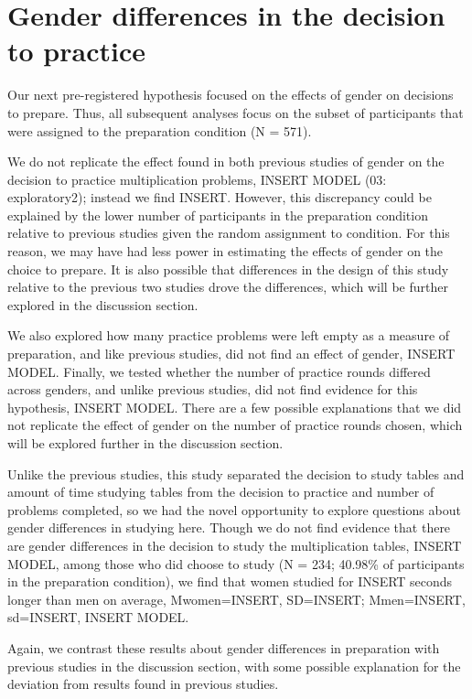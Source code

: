 \documentclass[a4paper, nobind]{templates/ociamthesis}
\begin{document}
\hypertarget{gender-differences-in-the-decision-to-practice}{%
\section{Gender differences in the decision to practice}\label{gender-differences-in-the-decision-to-practice}}

Our next pre-registered hypothesis focused on the effects of gender on decisions to prepare. Thus, all subsequent analyses focus on the subset of participants that were assigned to the preparation condition (N = 571).

We do not replicate the effect found in both previous studies of gender on the decision to practice multiplication problems, INSERT MODEL (03: exploratory2); instead we find INSERT. However, this discrepancy could be explained by the lower number of participants in the preparation condition relative to previous studies given the random assignment to condition. For this reason, we may have had less power in estimating the effects of gender on the choice to prepare. It is also possible that differences in the design of this study relative to the previous two studies drove the differences, which will be further explored in the discussion section.

We also explored how many practice problems were left empty as a measure of preparation, and like previous studies, did not find an effect of gender, INSERT MODEL. Finally, we tested whether the number of practice rounds differed across genders, and unlike previous studies, did not find evidence for this hypothesis, INSERT MODEL. There are a few possible explanations that we did not replicate the effect of gender on the number of practice rounds chosen, which will be explored further in the discussion section.

Unlike the previous studies, this study separated the decision to study tables and amount of time studying tables from the decision to practice and number of problems completed, so we had the novel opportunity to explore questions about gender differences in studying here. Though we do not find evidence that there are gender differences in the decision to study the multiplication tables, INSERT MODEL, among those who did choose to study (N = 234; 40.98\% of participants in the preparation condition), we find that women studied for INSERT seconds longer than men on average, Mwomen=INSERT, SD=INSERT; Mmen=INSERT, sd=INSERT, INSERT MODEL.

Again, we contrast these results about gender differences in preparation with previous studies in the discussion section, with some possible explanation for the deviation from results found in previous studies.
\end{document}
